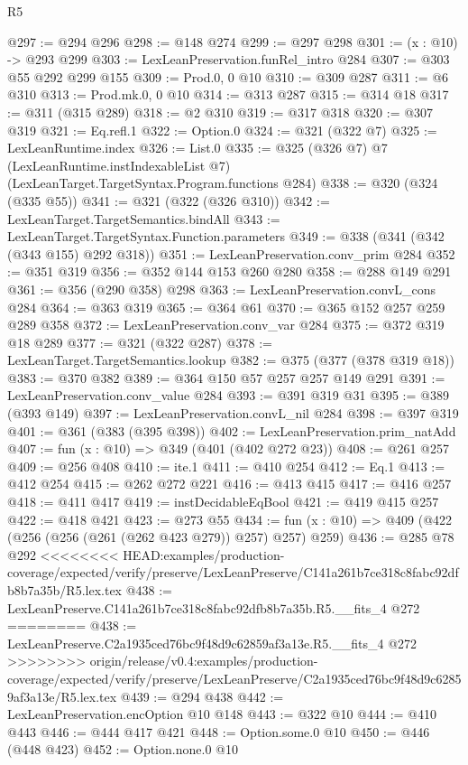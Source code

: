 \begin{lexlean}{R5}
\begin{coremodule}
{{{{{{{{{@297 := @294 @296
@298 := @148 @274
@299 := @297 @298
@301 := (x : @10) -> @293 @299
@303 := LexLeanPreservation.funRel_intro @284
@307 := @303 @55 @292 @299 @155
@309 := Prod.{0, 0} @10
@310 := @309 @287
@311 := @6 @310
@313 := Prod.mk.{0, 0} @10
@314 := @313 @287
@315 := @314 @18
@317 := @311 (@315 @289)
@318 := @2 @310
@319 := @317 @318
@320 := @307 @319
@321 := Eq.refl.{1}
@322 := Option.{0}
@324 := @321 (@322 @7)
@325 := LexLeanRuntime.index
@326 := List.{0}
@335 := @325
    (@326 @7)
    @7
    (LexLeanRuntime.instIndexableList @7)
    (LexLeanTarget.TargetSyntax.Program.functions @284)
@338 := @320 (@324 (@335 @55))
@341 := @321 (@322 (@326 @310))
@342 := LexLeanTarget.TargetSemantics.bindAll
@343 := LexLeanTarget.TargetSyntax.Function.parameters
@349 := @338 (@341 (@342 (@343 @155) @292 @318))
@351 := LexLeanPreservation.conv_prim @284
@352 := @351 @319
@356 := @352 @144 @153 @260 @280
@358 := @288 @149 @291
@361 := @356 (@290 @358) @298
@363 := LexLeanPreservation.convL_cons @284
@364 := @363 @319
@365 := @364 @61
@370 := @365 @152 @257 @259 @289 @358
@372 := LexLeanPreservation.conv_var @284
@375 := @372 @319 @18 @289
@377 := @321 (@322 @287)
@378 := LexLeanTarget.TargetSemantics.lookup
@382 := @375 (@377 (@378 @319 @18))
@383 := @370 @382
@389 := @364 @150 @57 @257 @257 @149 @291
@391 := LexLeanPreservation.conv_value @284
@393 := @391 @319 @31
@395 := @389 (@393 @149)
@397 := LexLeanPreservation.convL_nil @284
@398 := @397 @319
@401 := @361 (@383 (@395 @398))
@402 := LexLeanPreservation.prim_natAdd
@407 := fun (x : @10) => @349 (@401 (@402 @272 @23))
@408 := @261 @257
@409 := @256 @408
@410 := ite.{1}
@411 := @410 @254
@412 := Eq.{1}
@413 := @412 @254
@415 := @262 @272 @221
@416 := @413 @415
@417 := @416 @257
@418 := @411 @417
@419 := instDecidableEqBool
@421 := @419 @415 @257
@422 := @418 @421
@423 := @273 @55
@434 := fun (x : @10) => @409 (@422 (@256 (@256 (@261 (@262 @423 @279)) @257) @257) @259)
@436 := @285 @78 @292
<<<<<<<< HEAD:examples/production-coverage/expected/verify/preserve/LexLeanPreserve/C141a261b7ce318c8fabc92dfb8b7a35b/R5.lex.tex
@438 := LexLeanPreserve.C141a261b7ce318c8fabc92dfb8b7a35b.R5.__fits_4 @272
========
@438 := LexLeanPreserve.C2a1935ced76bc9f48d9c62859af3a13e.R5.__fits_4 @272
>>>>>>>> origin/release/v0.4:examples/production-coverage/expected/verify/preserve/LexLeanPreserve/C2a1935ced76bc9f48d9c62859af3a13e/R5.lex.tex
@439 := @294 @438
@442 := LexLeanPreservation.encOption @10 @148
@443 := @322 @10
@444 := @410 @443
@446 := @444 @417 @421
@448 := Option.some.{0} @10
@450 := @446 (@448 @423)
@452 := Option.none.{0} @10
}}}}}}}}}
\end{coremodule}
\end{lexlean}
